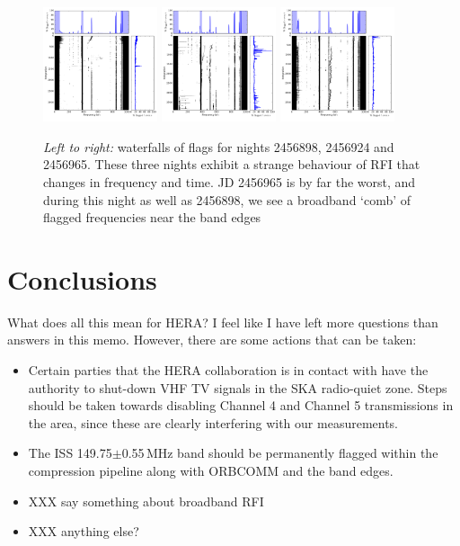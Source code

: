 \documentclass[10pt,a4paper]{article}
\begin{document}
\begin{figure}
\centering
\includegraphics[width=0.3\textwidth]{RFI-images/2456898RFI.png}
\includegraphics[width=0.3\textwidth]{RFI-images/2456924RFI.png}
\includegraphics[width=0.3\textwidth]{RFI-images/2456965RFI.png}
\caption{\textit{Left to right:} waterfalls of flags for nights 2456898, 2456924 and 2456965. These three nights exhibit a strange behaviour of RFI that changes in frequency and time. JD 2456965 is by far the worst, and during this night as well as 2456898, we see a broadband `comb' of flagged frequencies near the band edges}
\label{fig:wandering}
\end{figure}

\section{Conclusions}

What does all this mean for HERA? I feel like I have left more questions than answers in this memo. However, there are some actions that can be taken:
\begin{itemize}
\item Certain parties that the HERA collaboration is in contact with have the authority to shut-down VHF TV signals in the SKA radio-quiet zone. Steps should be taken towards disabling Channel 4 and Channel 5 transmissions in the area, since these are clearly interfering with our measurements.
\item The ISS 149.75$\pm$0.55\,MHz band should be permanently flagged within the compression pipeline along with ORBCOMM and the band edges.
\item XXX say something about broadband RFI
\item XXX  anything else?
\end{itemize}
\end{document}
